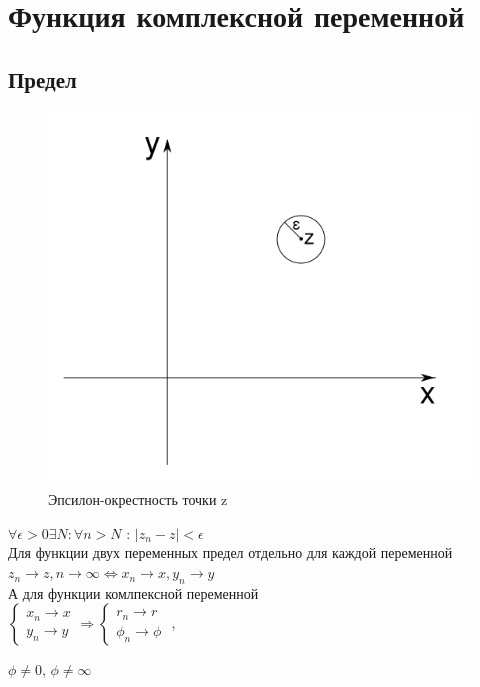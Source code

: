 \documentclass{article}
\begin{document}
         \section{Функция комплексной переменной}
            \subsection{Предел}
                \begin{figure}[h]
                  \includegraphics[width=0.6\linewidth]{complex_epsilon_example}
                  \caption{Эпсилон-окрестность точки z}
                  \label{ris:complex_epsolon_example}
                \end{figure}
                $\forall \epsilon > 0 \exists N : \forall n>N $ : 
                $|z_{n}-z|< \epsilon$\\
             Для функции двух переменных предел отдельно для каждой переменной $ z_{n} \rightarrow z,n \rightarrow \infty \Leftrightarrow x_{n} \rightarrow x,y_{n} \rightarrow y$\\
             А для функции комлпексной переменной\\ \begin{math} \begin{cases} x_{n} \rightarrow x \\ y_{n} \rightarrow y \end{cases} \Rightarrow 
             \begin{cases} r_{n} \rightarrow r \\ \phi_{n} \rightarrow \phi \end{cases} \end{math}
              , \begin{nobreak} $\phi \neq 0$, $\phi \neq \infty$ \end{nobreak} 
              \newpage
\end{document}
